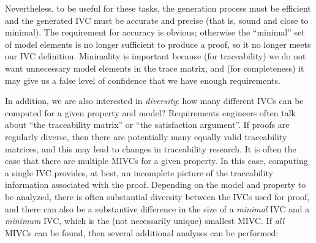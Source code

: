 \noindent Nevertheless, to be useful for these tasks, the generation
process must be efficient and the generated IVC must be
accurate and precise (that is, sound and close to minimal).  The requirement for accuracy is obvious; otherwise the ``minimal'' set of model elements is no longer sufficient to produce a proof, so it no longer meets our IVC definition.  Minimality is important because (for traceability) we do not want unnecessary model elements in the trace matrix, and (for completeness) it may give us a false level of confidence that we have enough requirements.

In addition, %
we are also interested in {\em diversity}:  how many different IVCs can be computed for a given property and model? Requirements engineers often talk about ``the traceability matrix'' or ``the satisfaction argument''.  If proofs are regularly diverse, then there are potentially many equally valid traceability matrices, and this may lead to changes in traceability research.
It is often the case that there are multiple MIVCs for a given property.  In this case, computing a single IVC provides, at best, an incomplete picture of the traceability information associated with the proof.  Depending on the model and property to be analyzed, there is often substantial diversity between the IVCs used for proof, and there can also be a substantive difference in the size of a {\em minimal} IVC and a {\em minimum} IVC, which is the (not necessarily unique) smallest MIVC.
 If {\em all} MIVCs can be found, then several additional analyses can be performed:
